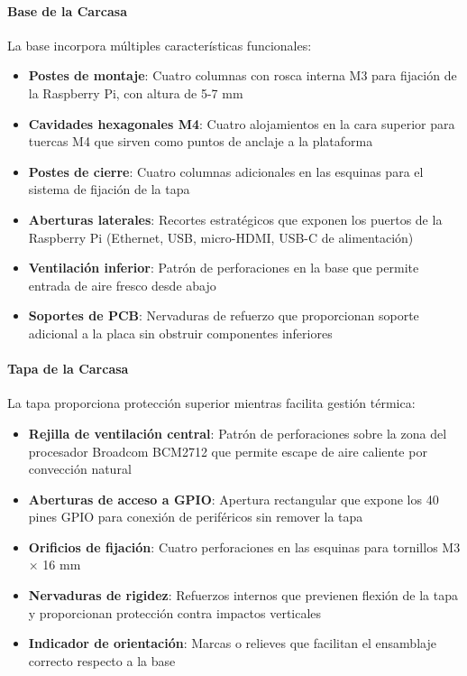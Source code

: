 \paragraph{Base de la Carcasa}

La base incorpora múltiples características funcionales:

\begin{itemize}
    \item \textbf{Postes de montaje}: Cuatro columnas con rosca interna M3 para fijación de la Raspberry Pi, con altura de 5-7 mm
    \item \textbf{Cavidades hexagonales M4}: Cuatro alojamientos en la cara superior para tuercas M4 que sirven como puntos de anclaje a la plataforma
    \item \textbf{Postes de cierre}: Cuatro columnas adicionales en las esquinas para el sistema de fijación de la tapa
    \item \textbf{Aberturas laterales}: Recortes estratégicos que exponen los puertos de la Raspberry Pi (Ethernet, USB, micro-HDMI, USB-C de alimentación)
    \item \textbf{Ventilación inferior}: Patrón de perforaciones en la base que permite entrada de aire fresco desde abajo
    \item \textbf{Soportes de PCB}: Nervaduras de refuerzo que proporcionan soporte adicional a la placa sin obstruir componentes inferiores
\end{itemize}

\paragraph{Tapa de la Carcasa}

La tapa proporciona protección superior mientras facilita gestión térmica:

\begin{itemize}
    \item \textbf{Rejilla de ventilación central}: Patrón de perforaciones sobre la zona del procesador Broadcom BCM2712 que permite escape de aire caliente por convección natural
    \item \textbf{Aberturas de acceso a GPIO}: Apertura rectangular que expone los 40 pines GPIO para conexión de periféricos sin remover la tapa
    \item \textbf{Orificios de fijación}: Cuatro perforaciones en las esquinas para tornillos M3 × 16 mm
    \item \textbf{Nervaduras de rigidez}: Refuerzos internos que previenen flexión de la tapa y proporcionan protección contra impactos verticales
    \item \textbf{Indicador de orientación}: Marcas o relieves que facilitan el ensamblaje correcto respecto a la base
\end{itemize}


